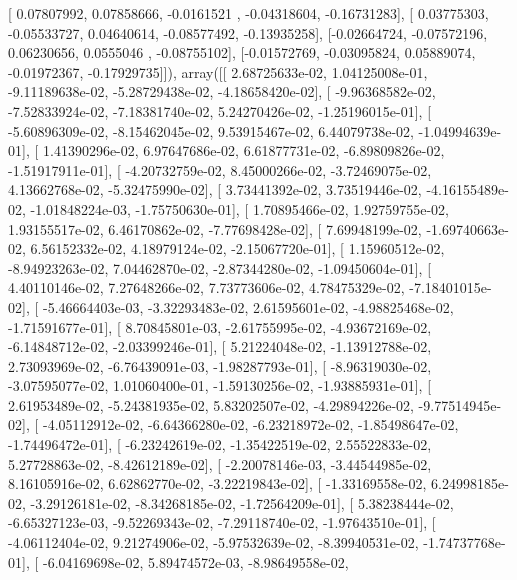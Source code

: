 \documentclass{article}
\begin{document}
       [ 0.07807992,  0.07858666, -0.0161521 , -0.04318604, -0.16731283],
       [ 0.03775303, -0.05533727,  0.04640614, -0.08577492, -0.13935258],
       [-0.02664724, -0.07572196,  0.06230656,  0.0555046 , -0.08755102],
       [-0.01572769, -0.03095824,  0.05889074, -0.01972367, -0.17929735]]), array([[  2.68725633e-02,   1.04125008e-01,  -9.11189638e-02,
         -5.28729438e-02,  -4.18658420e-02],
       [ -9.96368582e-02,  -7.52833924e-02,  -7.18381740e-02,
          5.24270426e-02,  -1.25196015e-01],
       [ -5.60896309e-02,  -8.15462045e-02,   9.53915467e-02,
          6.44079738e-02,  -1.04994639e-01],
       [  1.41390296e-02,   6.97647686e-02,   6.61877731e-02,
         -6.89809826e-02,  -1.51917911e-01],
       [ -4.20732759e-02,   8.45000266e-02,  -3.72469075e-02,
          4.13662768e-02,  -5.32475990e-02],
       [  3.73441392e-02,   3.73519446e-02,  -4.16155489e-02,
         -1.01848224e-03,  -1.75750630e-01],
       [  1.70895466e-02,   1.92759755e-02,   1.93155517e-02,
          6.46170862e-02,  -7.77698428e-02],
       [  7.69948199e-02,  -1.69740663e-02,   6.56152332e-02,
          4.18979124e-02,  -2.15067720e-01],
       [  1.15960512e-02,  -8.94923263e-02,   7.04462870e-02,
         -2.87344280e-02,  -1.09450604e-01],
       [  4.40110146e-02,   7.27648266e-02,   7.73773606e-02,
          4.78475329e-02,  -7.18401015e-02],
       [ -5.46664403e-03,  -3.32293483e-02,   2.61595601e-02,
         -4.98825468e-02,  -1.71591677e-01],
       [  8.70845801e-03,  -2.61755995e-02,  -4.93672169e-02,
         -6.14848712e-02,  -2.03399246e-01],
       [  5.21224048e-02,  -1.13912788e-02,   2.73093969e-02,
         -6.76439091e-03,  -1.98287793e-01],
       [ -8.96319030e-02,  -3.07595077e-02,   1.01060400e-01,
         -1.59130256e-02,  -1.93885931e-01],
       [  2.61953489e-02,  -5.24381935e-02,   5.83202507e-02,
         -4.29894226e-02,  -9.77514945e-02],
       [ -4.05112912e-02,  -6.64366280e-02,  -6.23218972e-02,
         -1.85498647e-02,  -1.74496472e-01],
       [ -6.23242619e-02,  -1.35422519e-02,   2.55522833e-02,
          5.27728863e-02,  -8.42612189e-02],
       [ -2.20078146e-03,  -3.44544985e-02,   8.16105916e-02,
          6.62862770e-02,  -3.22219843e-02],
       [ -1.33169558e-02,   6.24998185e-02,  -3.29126181e-02,
         -8.34268185e-02,  -1.72564209e-01],
       [  5.38238444e-02,  -6.65327123e-03,  -9.52269343e-02,
         -7.29118740e-02,  -1.97643510e-01],
       [ -4.06112404e-02,   9.21274906e-02,  -5.97532639e-02,
         -8.39940531e-02,  -1.74737768e-01],
       [ -6.04169698e-02,   5.89474572e-03,  -8.98649558e-02,
\end{document}
